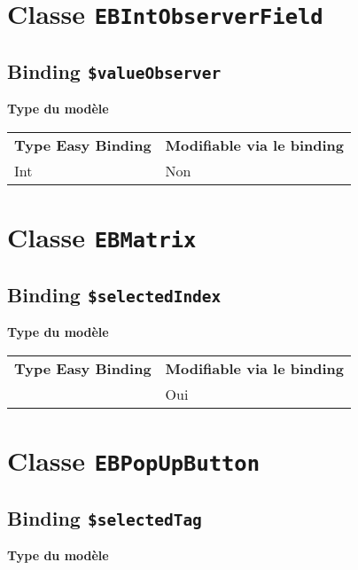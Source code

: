 \section{Classe \texttt{EBIntObserverField}}

\subsection{Binding \texttt{\$valueObserver}}

{\bf Type du modèle}

\begin{tabular}{ll}
\textbf{Type Easy Binding} & \textbf{Modifiable via le binding}\\
Int& Non\\
\end{tabular}







\section{Classe \texttt{EBMatrix}}

\subsection{Binding \texttt{\$selectedIndex}}

{\bf Type du modèle}

\begin{tabular}{ll}
\textbf{Type Easy Binding} & \textbf{Modifiable via le binding}\\
& Oui\\
\end{tabular}







\section{Classe \texttt{EBPopUpButton}}

\subsection{Binding \texttt{\$selectedTag}}

{\bf Type du modèle}

